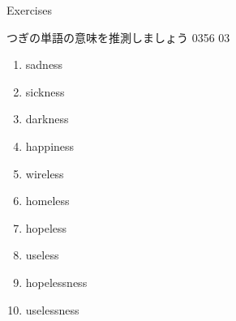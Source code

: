 \documentclass[aspectratio=169,xcolor={dvipsnames,table}]{beamer}
\begin{document}
\begin{frame}[plain]{Exercises}
 
つぎの単語の意味を推測しましょう
\hfill{\tiny 0356}\,{\scriptsize {}\,03}

\begin{enumerate}
 \item sadness
 \item sickness
 \item darkness
 \item happiness
 \item wireless
 \item homeless
 \item hopeless
 \item useless
 \item hopelessness
 \item uselessness
\end{enumerate}
\end{frame}


\end{document}
